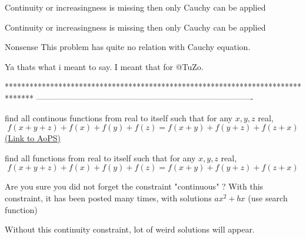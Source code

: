 \begin{solution}
	Continuity or increasingness is missing then only Cauchy can be applied
\end{solution}



\begin{solution}
	\begin{tcolorbox}Continuity or increasingness is missing then only Cauchy can be applied\end{tcolorbox}

Nonsense
This problem has quite no relation with Cauchy equation.

\end{solution}



\begin{solution}
	Ya thats what i meant to say. I meant that for @TuZo.
\end{solution}
*******************************************************************************
-------------------------------------------------------------------------------

\begin{problem}
	find all continous functions from real to itself such that for any $x,y,z$ real, $$f(x+y+z)+f(x)+f(y)+f(z)=f(x+y)+f(y+z)+f(z+x)$$
	\flushright \href{https://artofproblemsolving.com/community/c6h1577506}{(Link to AoPS)}
\end{problem}



\begin{solution}
	\begin{tcolorbox}find all functions from real to itself such that for any $x,y,z$ real, $$f(x+y+z)+f(x)+f(y)+f(z)=f(x+y)+f(y+z)+f(z+x)$$\end{tcolorbox}

Are you sure you did not forget the constraint "continuous" ?
With this constraint, it has been posted many times, with solutions $ax^2+bx$ (use search function)

Without this continuity constraint,  lot of weird solutions will appear.

\end{solution}



